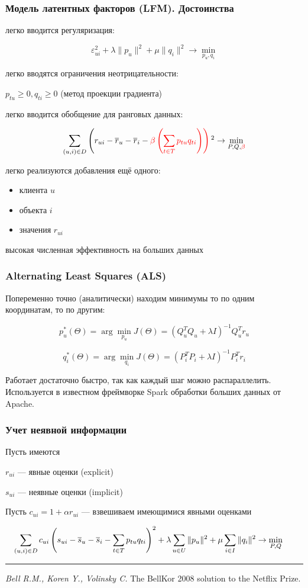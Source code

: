 \documentclass[fullscreen=true, bookmarks=true, hyperref={pdfencoding=unicode}]{beamer}
\begin{document}
\begin{frame}
  \frametitle{Модель латентных факторов (LFM). Достоинства}

  легко вводится регуляризация:

  $$ \varepsilon^2_{ui} + \lambda \|p_u\|^2 + \mu \|q_i\|^2 \to \min\limits_{p_u, q_i}$$

  легко вводятся ограничения неотрицательности:

  $ p_{tu} \geq 0, q_{ti} \geq 0 $ (метод проекции градиента)

  легко вводится обобщение для ранговых данных:

  $$ \sum\limits_{(u,i) \in D} \left(r_{ui} - \overline r_{u} - \overline r_{i} - \color{red}{\beta} \left(\sum\limits_{t \in T} p_{tu}q_{ti} \right) \right)^2 \to \min\limits_{P, Q, \color{red}{\beta}}$$

  легко реализуются добавления ещё одного:
  \begin{itemize}
   \item клиента $u$
   \item объекта $i$
   \item значения $r_{ui}$
  \end{itemize}

   высокая численная эффективность на больших данных
\end{frame}


\begin{frame}
  \frametitle{Alternating Least Squares (ALS)}

  Попеременно точно (аналитически) находим минимумы то по одним координатам, то по другим:

  $$ p_u^* (\Theta) = \arg\min\limits_{p_u} J(\Theta) = \left(Q_u^TQ_u + \lambda I \right)^{-1} Q_u^T r_u$$

  $$ q_i^* (\Theta) = \arg\min\limits_{q_i} J(\Theta) = \left(P_i^TP_i + \lambda I \right)^{-1} P_i^T r_i$$

  Работает достаточно быстро, так как каждый шаг можно распараллелить. Используется в известном фреймворке Spark обработки больших данных от Apache.
\end{frame}


\begin{frame}
  \frametitle{Учет неявной информации}

  Пусть имеются

  $r_{ui}$ — явные оценки (explicit)

  $s_{ui}$ — неявные оценки (implicit)

  Пусть $c_{ui} = 1 + \alpha r_{ui}$ — взвешиваем имеющимися явными оценками

  $$ \hspace{-0.5cm} \sum\limits_{(u,i) \in D} c_{ui} \left(s_{ui} - \overline s_u - \overline s_i - \sum\limits_{t \in T} p_{tu}q_{ti} \right)^2   + \lambda \sum\limits_{u \in U} \|p_u \|^2 + \mu \sum\limits_{i \in I} \|q_i \|^2 \to \min\limits_{P, Q}$$

  \vspace{1cm}
  \noindent\rule{8cm}{0.4pt}

  {\small
  {\it Bell R.M., Koren Y., Volinsky C.} The BellKor 2008 solution to the Netflix Prize.}

\end{frame}
\end{document}
